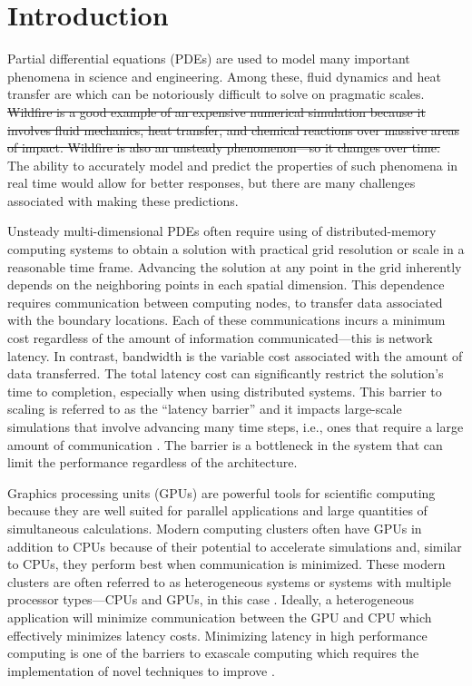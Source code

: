 \documentclass[mca,article,submit,moreauthors,pdftex]{Definitions/mdpi}
\newcommand{\revised}[2]{{\sloppy\cbcolor{#2}\textcolor{#2}{\cbstart {#1} \cbend}}}  %
\newcommand{\former}[2]{\sloppy\cbcolor{#2}\textcolor{#2}{\cbdelete\sout{#1}}}
\begin{document}
\section{Introduction}
Partial differential equations (PDEs) are used to model many important phenomena in science and engineering. 
Among these, fluid dynamics and heat transfer are which can be notoriously difficult to solve on pragmatic scales. \former{Wildfire is a good example of an expensive numerical simulation because it involves fluid mechanics, heat transfer, and chemical reactions over massive areas of impact. Wildfire is also an unsteady phenomenon---so it changes over time.}{revTwo} 
The ability to accurately model and predict the properties of such phenomena in real time would allow for better responses, but there are many challenges associated with making these predictions.

Unsteady multi-dimensional PDEs often require using of distributed-memory computing systems to obtain a solution with practical grid resolution or scale in a reasonable time frame. Advancing the solution at any point in the grid inherently depends on the neighboring points in each spatial dimension. This dependence requires communication between computing nodes, to transfer data associated with the boundary locations. Each of these communications incurs a minimum cost regardless of the amount of information communicated---this is network latency. In contrast, bandwidth is the variable cost associated with the amount of data transferred. The total latency cost can significantly restrict the solution's time to completion, especially when using distributed systems. This barrier to scaling is referred to as the ``latency barrier'' and it impacts large-scale simulations that involve advancing many time steps, i.e., ones that require a large amount of communication \cite{alhubail_swept_2016-1}. The barrier is a bottleneck in the system that can limit the performance regardless of the architecture.

Graphics processing units (GPUs) are powerful tools for scientific computing because they are well suited for parallel applications and large quantities of simultaneous calculations. Modern computing clusters often have GPUs in addition to CPUs because of their potential to accelerate simulations and, similar to CPUs, they perform best when communication is minimized. These modern clusters are often referred to as heterogeneous systems or systems with multiple processor types---CPUs and GPUs, in this case \cite{owens_survey_2007,owens_gpu_2008}. 
Ideally, a heterogeneous application will minimize communication between the GPU and CPU which effectively minimizes latency costs. Minimizing latency in high performance computing is one of the barriers to exascale computing which requires the implementation of novel techniques to improve \cite{alexandrov_route_2016}.
\end{document}
